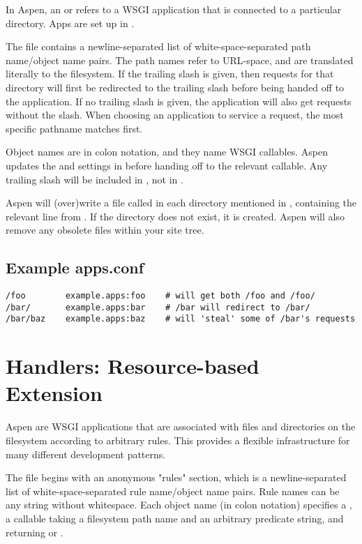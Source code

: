 In Aspen, an  or  refers to a WSGI application that is
connected to a particular directory. Apps are set up in .

The  file contains a newline-separated list of
white-space-separated path name/object name pairs. The path names refer to
URL-space, and are translated literally to the filesystem. If the trailing slash
is given, then requests for that directory will first be redirected to the
trailing slash before being handed off to the application. If no trailing slash
is given, the application will also get requests without the slash. When
choosing an application to service a request, the most specific pathname matches
first.

Object names are in colon notation, and they name WSGI callables. Aspen updates
the  and  settings in  before
handing off to the relevant callable. Any trailing slash will be included in
, not in .

Aspen will (over)write a file called  in each directory
mentioned in , containing the relevant line from
. If the directory does not exist, it is created. Aspen will
also remove any obsolete  files within your site tree.


\subsection{Example apps.conf}

\begin{verbatim}
/foo        example.apps:foo    # will get both /foo and /foo/
/bar/       example.apps:bar    # /bar will redirect to /bar/
/bar/baz    example.apps:baz    # will 'steal' some of /bar's requests
\end{verbatim}


\section{Handlers: Resource-based Extension \label{handlers}}

Aspen  are WSGI applications that are associated with files and
directories on the filesystem according to arbitrary rules. This provides a
flexible infrastructure for many different development patterns.

The  file begins with an anonymous "rules" section,
which is a newline-separated list of white-space-separated rule name/object name
pairs. Rule names can be any string without whitespace. Each object name (in
colon notation) specifies a , a callable taking a filesystem path name
and an arbitrary predicate string, and returning  or .

